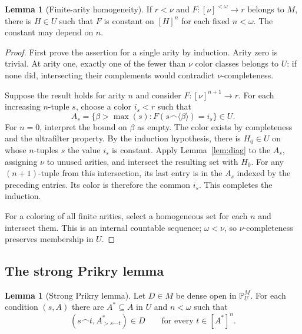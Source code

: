 \documentclass[11pt,letterpaper]{article}
\theoremstyle{definition}
\newtheorem{lemma}[definition]{Lemma}
\numberwithin{equation}{section}
\newcommand{\PP}{\mathbb P}
\newcommand{\suff}{\mathbin{\smallfrown}}
\begin{document}
\begin{lemma}[Finite-arity homogeneity]\label{lem:homogeneous}
If $r<\nu$ and $F:[\nu]^{<\omega}\to r$ belongs to $M$, there is
$H\in U$ such that $F$ is constant on $[H]^n$ for each fixed
$n<\omega$. The constant may depend on $n$.
\end{lemma}

\begin{proof}
First prove the assertion for a single arity by induction. Arity zero
is trivial. At arity one, exactly one of the fewer than $\nu$ color
classes belongs to $U$: if none did, intersecting their complements
would contradict $\nu$-completeness.

Suppose the result holds for arity $n$ and consider
$F:[\nu]^{n+1}\to r$. For each increasing $n$-tuple $s$, choose a
color $i_s<r$ such that
\[
 A_s=\{\beta>\max(s):F(s\suff\langle\beta\rangle)=i_s\}\in U.
\]
For $n=0$, interpret the bound on $\beta$ as empty. The color exists
by completeness and the ultrafilter property. By the induction
hypothesis, there is $H_0\in U$ on whose $n$-tuples $s$ the value
$i_s$ is constant. Apply Lemma~\ref{lem:diag} to the $A_s$, assigning
$\nu$ to unused arities, and intersect the resulting set with $H_0$.
For any $(n+1)$-tuple from this intersection, its last entry is in
the $A_s$ indexed by the preceding entries. Its color is therefore
the common $i_s$. This completes the induction.

For a coloring of all finite arities, select a homogeneous set for
each $n$ and intersect them. This is an internal countable sequence;
$\omega<\nu$, so $\nu$-completeness preserves membership in $U$.
\end{proof}

\subsection{The strong Prikry lemma}

\begin{lemma}[Strong Prikry lemma]\label{lem:strongprikry}
Let $D\in M$ be dense open in $\PP_U^M$. For each condition $(s,A)$
there are $A^*\subseteq A$ in $U$ and $n<\omega$ such that
\[
 (s\suff t,A^*_{>s\suff t})\in D
 \qquad\text{for every }t\in[A^*]^n.
\]
\end{lemma}
\end{document}
